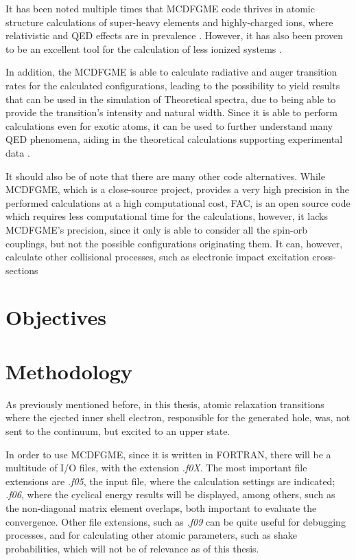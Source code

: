 It has been noted multiple times that \gls{MCDFGME} code thrives in atomic structure calculations of super-heavy elements and highly-charged ions, where relativistic and QED effects are in prevalence \cite{Indelicato2011,Indelicato1987,Gorceix1987}. However, it has also been proven to be an excellent tool for the calculation of less ionized systems \cite{Guerra2021}.

In addition, the \gls{MCDFGME} is able to calculate radiative and auger transition rates for the calculated configurations, leading to the possibility to yield results that can be used in the simulation of Theoretical spectra, due to being able to provide the transition's intensity and natural width. Since it is able to perform calculations even for exotic atoms, it can be used to further understand many QED phenomena, aiding in the theoretical calculations supporting experimental data \cite{Paul2021}.

It should also be of note that there are many other code alternatives. While \gls{MCDFGME}, which is a close-source project, provides a very high precision in the performed calculations at a high computational cost, \gls{FAC}, is an open source code which requires less computational time for the calculations, however, it lacks \gls{MCDFGME}'s precision, since it only is able to consider all the spin-orb couplings, but not the possible configurations originating them. 
It can, however, calculate other collisional processes, such as electronic impact excitation cross-sections \cite{FAC}



\section{Objectives}

\section{Methodology}

As previously mentioned before, in this thesis, atomic relaxation transitions where the ejected inner shell electron, responsible for the generated hole, was, not sent to the continuum, but excited to an upper state.

In order to use \gls{MCDFGME}, since it is written in FORTRAN, there will be a multitude of I/O files, with the extension \textit{.f0X}. The most important file extensions are \textit{.f05}, the input file, where the calculation settings are indicated; \textit{.f06}, where the cyclical energy results will be displayed, among others, such as the non-diagonal matrix element overlaps, both important to evaluate the convergence.
 Other file extensions, such as \textit{.f09} can be quite useful for debugging processes, and for calculating other atomic parameters, such as shake probabilities, which will not be of relevance as of this thesis.


